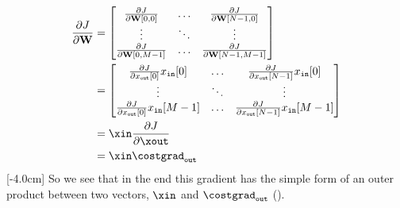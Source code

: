 \begin{align}
    \frac{\partial J}{\partial \mathbf{W}} & =
    \begin{bmatrix}
        \frac{\partial J}{\partial \mathbf{W}[0,0]}   & \ldots & \frac{\partial J}{\partial \mathbf{W}[N-1,0]}   \\
        \vdots                                        & \ddots & \vdots                                          \\
        \frac{\partial J}{\partial \mathbf{W}[0,M-1]} & \ldots & \frac{\partial J}{\partial \mathbf{W}[N-1,M-1]} \\
    \end{bmatrix}                                                   \\
                                           & =
    \begin{bmatrix}
        \frac{\partial J}{\partial x_{\texttt{out}}[0]}x_{\texttt{in}}[0]   & \ldots & \frac{\partial J}{\partial x_{\texttt{out}}[N-1]}x_{\texttt{in}}[0]   \\
        \vdots                                                              & \ddots & \vdots                                                                \\
        \frac{\partial J}{\partial x_{\texttt{out}}[0]}x_{\texttt{in}}[M-1] & \ldots & \frac{\partial J}{\partial x_{\texttt{out}}[N-1]}x_{\texttt{in}}[M-1] \\
    \end{bmatrix} \\
                                           & = \xin \frac{\partial J}{\partial \xout}                                                                                        \\
                                           & = \xin \costgrad_{\texttt{out}}
\end{align}
[-4.0cm]
So we see that in the end this gradient has the simple form of an outer product between two vectors, $\xin$ and $\costgrad_{\texttt{out}}$ (\fig{\ref{fig:backpropagation:parameter_grad_linear_matrices}}).  %

